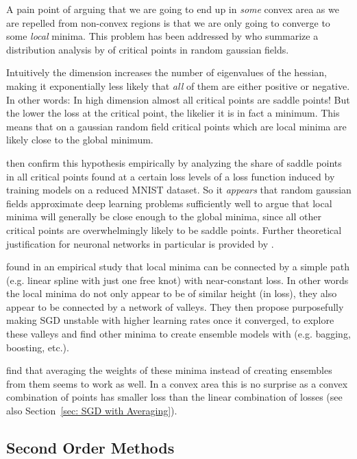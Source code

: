 A pain point of arguing that we are going to end up in \emph{some} convex area
as we are repelled from non-convex regions is that we are only going to
converge to some \emph{local} minima. This problem has been addressed by
\textcite{pascanuSaddlePointProblem2014} who summarize a distribution analysis
by \textcite{brayStatisticsCriticalPoints2007} of critical points in random
gaussian fields.

Intuitively the dimension increases the number of eigenvalues
of the hessian, making it exponentially less likely that \emph{all} of them are
either positive or negative. In other words: In high dimension almost all
critical points are saddle points! But the lower the loss at the critical point,
the likelier it is in fact a minimum. This means that on a gaussian random field
critical points which are local minima are likely close to the global minimum.

\textcite{pascanuSaddlePointProblem2014}
then confirm this hypothesis empirically by analyzing the share of saddle
points in all critical points found at a certain loss levels of a loss function
induced by training models on a reduced MNIST dataset. So it \emph{appears} that
random gaussian fields approximate deep learning problems sufficiently well to
argue that local minima will generally be close enough to the global minima,
since all other critical points are overwhelmingly likely to be saddle points.
Further theoretical justification for neuronal networks in particular is
provided by \textcite{choromanskaLossSurfacesMultilayer2015}.

\textcite{garipovLossSurfacesMode2018} found in an empirical study that local
minima can be connected by a simple path (e.g. linear spline with just one
free knot) with near-constant loss. In other words the local minima do not only
appear to be of similar height (in loss), they also appear to be connected
by a network of valleys. They then propose purposefully making SGD unstable
with higher learning rates once it converged, to explore these valleys and find
other minima to create ensemble models with (e.g. bagging, boosting, etc.). 

\textcite{izmailovAveragingWeightsLeads2019} find that averaging the weights
of these minima instead of creating ensembles from them seems to work as well.
In a convex area this is no surprise as a convex combination of points
has smaller loss than the linear combination of losses (see also
Section~\ref{sec: SGD with Averaging}).


\subsection{Second Order Methods}

